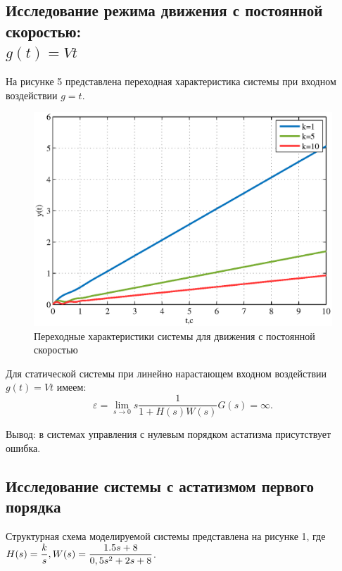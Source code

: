 \documentclass[a4paper,12pt]{article} %
\begin{document}
\subsection{Исследование режима движения с постоянной скоростью: \\$g(t)=Vt$} 
На рисунке 5 представлена переходная характеристика системы при входном воздействии $g=t$.
\begin{figure}[H]
	\centering
	\includegraphics[width=1\linewidth]{scheme/plot3.eps}
	\caption{Переходные характеристики системы для движения с постоянной скоростью}
\end{figure}
Для статической системы при линейно нарастающем входном воздействии $g(t)=Vt$ имеем:
\begin{equation}
    \varepsilon = \lim_{s\to0} s\frac{1}{1+H(s)W(s)}G(s) = \infty.
\end{equation}\par
Вывод: в системах управления с нулевым порядком астатизма присутствует ошибка.
\newpage
\begin{center}
\section{Исследование системы с астатизмом первого порядка}
\end{center}\par
Структурная схема моделируемой системы представлена на рисунке 1, где $H(s) = \displaystyle{\frac{k}{s}},\\W(s)=\displaystyle{\frac{1.5s+8}{0,5s^2+2s+8}}$.
\end{document}
